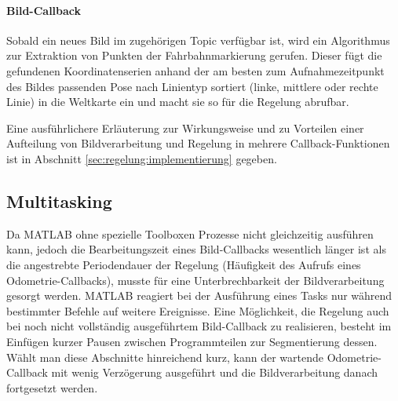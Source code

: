 \paragraph{Bild-Callback}
Sobald ein neues Bild im zugehörigen Topic verfügbar ist, wird ein Algorithmus zur Extraktion von Punkten der Fahrbahnmarkierung gerufen. Dieser fügt die gefundenen Koordinatenserien anhand der am besten zum Aufnahmezeitpunkt des Bildes passenden Pose nach Linientyp sortiert (\glqq linke\grqq , \glqq mittlere\grqq{} oder \glqq rechte\grqq{} Linie) in die Weltkarte ein und macht sie so für die Regelung abrufbar.

Eine ausführlichere Erläuterung zur Wirkungsweise und zu Vorteilen einer Aufteilung von Bildverarbeitung und Regelung in mehrere Callback-Funktionen ist in Abschnitt \ref{sec:regelung:implementierung} gegeben.
\subsection{Multitasking}
Da MATLAB ohne spezielle Toolboxen Prozesse nicht gleichzeitig ausführen kann, jedoch die Bearbeitungszeit eines Bild-Callbacks wesentlich länger ist als die angestrebte Periodendauer der Regelung (Häufigkeit des Aufrufs eines Odometrie-Callbacks), musste für eine Unterbrechbarkeit der Bildverarbeitung gesorgt werden. MATLAB reagiert bei der Ausführung eines Tasks nur während bestimmter Befehle auf weitere Ereignisse. Eine Möglichkeit, die Regelung auch bei noch nicht vollständig ausgeführtem Bild-Callback zu realisieren, besteht im Einfügen kurzer Pausen zwischen Programmteilen zur Segmentierung dessen. Wählt man diese Abschnitte hinreichend kurz, kann der wartende Odometrie-Callback mit wenig Verzögerung ausgeführt und die Bildverarbeitung danach fortgesetzt werden.


